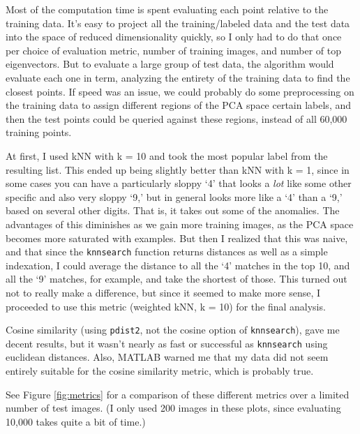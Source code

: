 \documentclass[11pt]{report}
\begin{document}
Most of the computation time is spent evaluating each point relative to the training data. It's easy to project all the training/labeled data and the test data into the space of reduced dimensionality quickly, so I only had to do that once per choice of evaluation metric, number of training images, and number of top eigenvectors. But to evaluate a large group of test data, the algorithm would evaluate each one in term, analyzing the entirety of the training data to find the closest points.
If speed was an issue, we could probably do some preprocessing on the training data to assign different regions of the PCA space certain labels, and then the test points could be queried against these regions, instead of all 60,000 training points.

At first, I used kNN with k = 10 and took the most popular label from the resulting list. This ended up being slightly better than kNN with k = 1, since in some cases you can have a particularly sloppy `4' that looks a \emph{lot} like some other specific and also very sloppy `9,' but in general looks more like a `4' than a `9,' based on several other digits. That is, it takes out some of the anomalies. The advantages of this diminishes as we gain more training images, as the PCA space becomes more saturated with examples. But then I realized that this was naive, and that since the \texttt{knnsearch} function returns distances as well as a simple indexation, I could average the distance to all the `4' matches in the top 10, and all the `9' matches, for example, and take the shortest of those. This turned out not to really make a difference, but since it seemed to make more sense, I proceeded to use this metric (weighted kNN, k = 10) for the final analysis.

Cosine similarity (using \texttt{pdist2}, not the cosine option of \texttt{knnsearch}), gave me decent results, but it wasn't nearly as fast or successful as \texttt{knnsearch} using euclidean distances. Also, MATLAB warned me that my data did not seem entirely suitable for the cosine similarity metric, which is probably true.

See Figure \ref{fig:metrics} for a comparison of these different metrics over a limited number of test images. (I only used 200 images in these plots, since evaluating 10,000 takes quite a bit of time.)
\end{document}

